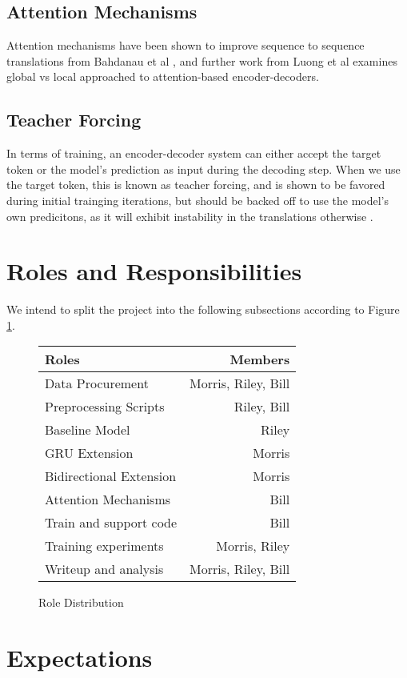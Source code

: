 \documentclass[twoside,twocolumn]{article}
\begin{document}
\subsection{Attention Mechanisms}
Attention mechanisms have been shown to improve sequence to sequence translations from Bahdanau et al \cite{bahdanau2014neural}, and further work from Luong et al \cite{luong2015effective} examines global vs local approached to attention-based encoder-decoders.
\subsection{Teacher Forcing}
In terms of training, an encoder-decoder system can either accept the target token or the model's prediction as input during the decoding step. When we use the target token, this is known as teacher forcing, and is shown to be favored during initial trainging iterations, but should be backed off to use the model's own predicitons, as it will exhibit instability in the translations otherwise \cite{lamb2016professor}.

\section{Roles and Responsibilities}
We intend to split the project into the following subsections according to Figure \ref{fig:roles}.

\begin{figure}
  \centering
  \begin{tabular}{ |l|r| }
      \hline
      \textbf{Roles} & \textbf{Members} \\
      \hline
      Data Procurement & Morris, Riley, Bill \\ \hline
      Preprocessing Scripts & Riley, Bill \\ \hline
      Baseline Model & Riley \\ \hline
      GRU Extension & Morris \\ \hline
      Bidirectional Extension & Morris \\ \hline
      Attention Mechanisms & Bill \\ \hline
      Train and support code & Bill \\ \hline
      Training experiments & Morris, Riley \\ \hline
      Writeup and analysis & Morris, Riley, Bill \\ \hline
  \end{tabular}
  \caption{Role Distribution}
  \label{fig:roles}
\end{figure}

\section{Expectations}



\end{document}
